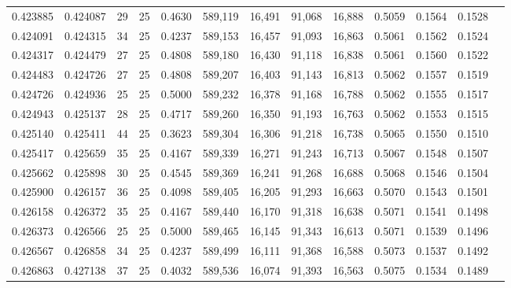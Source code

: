 \begin{tabular}{rrrrrrrrrrrrr}
0.423885 & 0.424087 &    29 &  25 &                                     0.4630 & 589,119 &  16,491 &  91,068 &  16,888 & 0.5059 & 0.1564 & 0.1528 \\
0.424091 & 0.424315 &    34 &  25 &                                     0.4237 & 589,153 &  16,457 &  91,093 &  16,863 & 0.5061 & 0.1562 & 0.1524 \\
0.424317 & 0.424479 &    27 &  25 &                                     0.4808 & 589,180 &  16,430 &  91,118 &  16,838 & 0.5061 & 0.1560 & 0.1522 \\
0.424483 & 0.424726 &    27 &  25 &                                     0.4808 & 589,207 &  16,403 &  91,143 &  16,813 & 0.5062 & 0.1557 & 0.1519 \\
0.424726 & 0.424936 &    25 &  25 &                                     0.5000 & 589,232 &  16,378 &  91,168 &  16,788 & 0.5062 & 0.1555 & 0.1517 \\
0.424943 & 0.425137 &    28 &  25 &                                     0.4717 & 589,260 &  16,350 &  91,193 &  16,763 & 0.5062 & 0.1553 & 0.1515 \\
0.425140 & 0.425411 &    44 &  25 &                                     0.3623 & 589,304 &  16,306 &  91,218 &  16,738 & 0.5065 & 0.1550 & 0.1510 \\
0.425417 & 0.425659 &    35 &  25 &                                     0.4167 & 589,339 &  16,271 &  91,243 &  16,713 & 0.5067 & 0.1548 & 0.1507 \\
0.425662 & 0.425898 &    30 &  25 &                                     0.4545 & 589,369 &  16,241 &  91,268 &  16,688 & 0.5068 & 0.1546 & 0.1504 \\
0.425900 & 0.426157 &    36 &  25 &                                     0.4098 & 589,405 &  16,205 &  91,293 &  16,663 & 0.5070 & 0.1543 & 0.1501 \\
0.426158 & 0.426372 &    35 &  25 &                                     0.4167 & 589,440 &  16,170 &  91,318 &  16,638 & 0.5071 & 0.1541 & 0.1498 \\
0.426373 & 0.426566 &    25 &  25 &                                     0.5000 & 589,465 &  16,145 &  91,343 &  16,613 & 0.5071 & 0.1539 & 0.1496 \\
0.426567 & 0.426858 &    34 &  25 &                                     0.4237 & 589,499 &  16,111 &  91,368 &  16,588 & 0.5073 & 0.1537 & 0.1492 \\
0.426863 & 0.427138 &    37 &  25 &                                     0.4032 & 589,536 &  16,074 &  91,393 &  16,563 & 0.5075 & 0.1534 & 0.1489 \\

\end{tabular}
